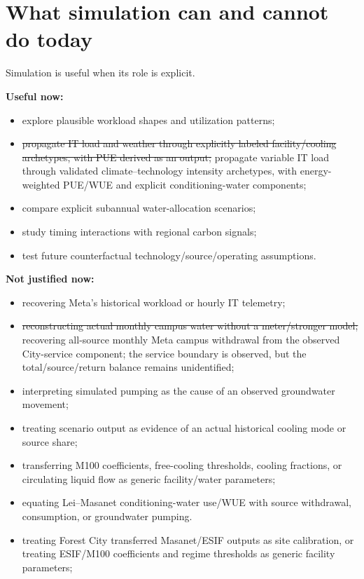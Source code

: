 \documentclass[11pt]{article}
\newcommand{\oldtxt}[1]{\textcolor{blue!70!black}{\sout{#1}}}
\newcommand{\newtxt}[1]{\textcolor{green!45!black}{#1}}
\newcommand{\latesttxt}[1]{\textcolor{purple!85!black}{#1}}
\begin{document}
\section{What simulation can and cannot do today}

Simulation is useful when its role is explicit.

\textbf{Useful now:}
\begin{itemize}
\item explore plausible workload shapes and utilization patterns;
\item \oldtxt{propagate IT load and weather through explicitly labeled facility/cooling archetypes, with PUE derived as an output;} \newtxt{propagate variable IT load through validated climate--technology intensity archetypes, with energy-weighted PUE/WUE and explicit conditioning-water components;}
\item compare explicit subannual water-allocation scenarios;
\item study timing interactions with regional carbon signals;
\item test future counterfactual technology/source/operating assumptions.
\end{itemize}

\textbf{Not justified now:}
\begin{itemize}
\item recovering Meta's historical workload or hourly IT telemetry;
\item \oldtxt{reconstructing actual monthly campus water without a meter/stronger model;} \latesttxt{recovering all-source monthly Meta campus withdrawal from the observed City-service component; the service boundary is observed, but the total/source/return balance remains unidentified;}
\item interpreting simulated pumping as the cause of an observed groundwater movement;
\item treating scenario output as evidence of an actual historical cooling mode or source share;
\item \newtxt{transferring M100 coefficients, free-cooling thresholds, cooling fractions, or circulating liquid flow as generic facility/water parameters;}
\item \newtxt{equating Lei--Masanet conditioning-water use/WUE with source withdrawal, consumption, or groundwater pumping.}
\item \latesttxt{treating Forest City transferred Masanet/ESIF outputs as site calibration, or treating ESIF/M100 coefficients and regime thresholds as generic facility parameters;}
\end{itemize}
\end{document}
